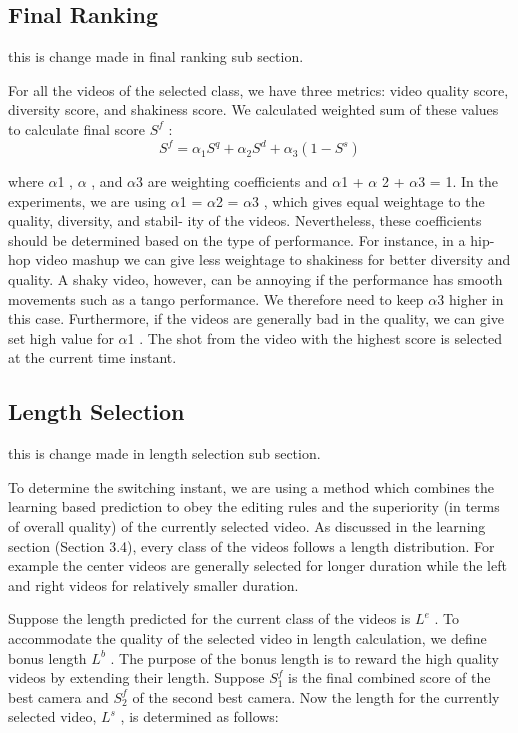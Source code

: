\documentclass{new}
\begin{document}
\subsection{Final Ranking}
this is change made in final ranking sub section.

For all the videos of the selected class, we have three metrics:
video quality score, diversity score, and shakiness score. We calculated weighted sum of these values to calculate final score $S^f$ :
\begin{equation}
    S^f = \alpha_1S^q + \alpha_2S^d + \alpha_3(1 - S^s)
\end{equation}

where $\alpha$1 , $\alpha $ , and $\alpha$3 are weighting coefficients and $\alpha$1 + $\alpha$ 2 +
$\alpha$3 = 1. In the experiments, we are using $\alpha$1 = $\alpha$2 = $\alpha$3 , which gives equal weightage to the quality, diversity, and stabil-
ity of the videos. Nevertheless, these coefficients should be determined based on the type of performance. For instance, in a hip-hop
video mashup we can give less weightage to shakiness for better diversity and quality. A shaky video, however, can be annoying if the
performance has smooth movements such as a tango performance.
We therefore need to keep $\alpha$3 higher in this case. Furthermore, if
the videos are generally bad in the quality, we can give set high
value for $\alpha$1 . The shot from the video with the highest score is
selected at the current time instant.

\subsection{Length Selection}
this is change made in length selection sub section.

To determine the switching instant, we are using a method which
combines the learning based prediction to obey the editing rules and
the superiority (in terms of overall quality) of the currently selected
video. As discussed in the learning section (Section 3.4), every
class of the videos follows a length distribution. For example the
center videos are generally selected for longer duration while the
left and right videos for relatively smaller duration.

Suppose the length predicted for the current class of the videos
is $L^e$ . To accommodate the quality of the selected video in length
calculation, we define bonus length $L^b$ . The purpose of the bonus
length is to reward the high quality videos by extending their length.
Suppose $S_1^f$ is the final combined score of the best camera and $S_2^f$
of the second best camera. Now the length for the currently selected
video, $L^s$ , is determined as follows:
\end{document}
